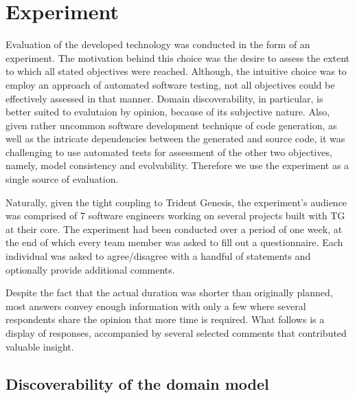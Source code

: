 \chapter{Experiment}

Evaluation of the developed technology was conducted in the form of an experiment.
The motivation behind this choice was the desire to assess the extent to which all stated objectives were reached.
Although, the intuitive choice was to employ an approach of automated software testing, not all objectives could be effectively assessed in that manner.
Domain discoverability, in particular, is better suited to evalutaion by opinion, because of its subjective nature. Also, given rather uncommon software development technique of code generation, as well as the intricate dependencies between the generated and source code, it was challenging to use automated tests for assessment of the other two objectives, namely, model consistency and evolvability. Therefore we use the experiment as a single source of evaluation.

\n

Naturally, given the tight coupling to Trident Genesis, the experiment's audience was comprised of 7 software engineers working on several projects built with TG at their core.
The experiment had been conducted over a period of one week, at the end of which every team member was asked to fill out a questionnaire.
Each individual was asked to agree/disagree with a handful of statements and optionally provide additional comments.

\n

Despite the fact that the actual duration was shorter than originally planned, most answers convey enough information with only a few where several respondents share the opinion that more time is required. 
What follows is a display of responses, accompanied by several selected comments that contributed valuable insight.

\section{Discoverability of the domain model}



